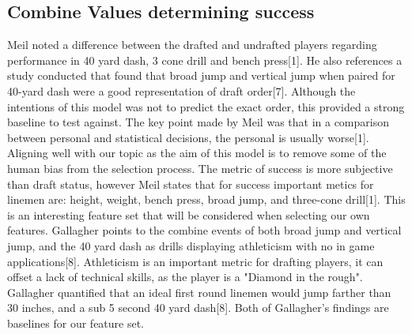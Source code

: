 \documentclass[confrence]{IEEEtran}
\begin{document}
\subsection*{Combine Values determining success}
Meil noted a difference between the drafted and undrafted players regarding performance in 40 yard dash, 3 cone drill and bench press[1].
He also references a study conducted that found that broad jump and vertical jump when paired for 40-yard dash were a good representation of draft order[7].
Although the intentions of this model was not to predict the exact order, this provided a strong baseline to test against.
The key point made by Meil was that in a comparison between personal and statistical decisions, the personal is usually worse[1].
Aligning well with our topic as the aim of this model is to remove some of the human bias from the selection process.
The metric of success is more subjective than draft status, however Meil states that for success important metics for linemen are: height, weight, bench press, broad jump, and three-cone drill[1].
This is an interesting feature set that will be considered when selecting our own features.
Gallagher points to the combine events of both broad jump and vertical jump, and the 40 yard dash as drills displaying athleticism with no in game applications[8].
Athleticism is an important metric for drafting players, it can offset a lack of technical skills, as the player is a "Diamond in the rough".
Gallagher quantified that an ideal first round linemen would jump farther than 30 inches, and a sub 5 second 40 yard dash[8].
Both of Gallagher's findings are baselines for our feature set.
\end{document}

